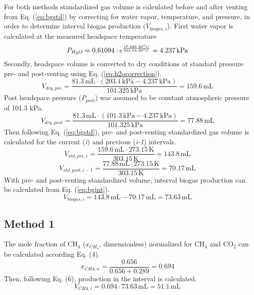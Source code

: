 \documentclass[]{article}
\newcommand{\unit}[1]{\ensuremath{\, \mathrm{#1}}}
\begin{document}
For both methods standardized gas volume is calculated before and after venting from Eq. (\ref{eq:bgstd}) by correcting for water vapor, temperature, and pressure, in order to determine interval biogas production ($V_{biogas,i}$). 
First water vapor is calculated at the measured headspace temperature
\begin{equation*}
    P_{H_{2}O} = 0.61094 \cdot e^\frac{17.625 \cdot 30\degree C}{243.04 \cdot 30\degree C} = 4.237\unit{kPa}
\end{equation*}
Secondly, headspace volume is converted to dry conditions at standard pressure pre- and post-venting using Eq. (\ref{eq:h2ocorrection}). 
\begin{equation*}
  V_{dry,pre} = \frac{81.3\unit{mL} \cdot (203.1\unit{kPa} - 4.237\unit{kPa})}{101.325\unit{kPa}} = 159.6\unit{mL}
\end{equation*}
Post headspace pressure ($P_{post}$) was assumed to be constant atmospheric pressure of 101.3 kPa. 
\begin{equation*}
    V_{dry,post} = \frac{81.3\unit{mL} \cdot (101.3\unit{kPa} - 4.237\unit{kPa})}{101.325\unit{kPa}} = 77.88\unit{mL}
\end{equation*}
Then following Eq. (\ref{eq:bgstd}), pre- and post-venting standardized gas volume is calculated for the current (\textit{i}) and previous (\textit{i-1}) intervals. 
\begin{equation*}
    V_{std,pre,i} = \frac{159.6\unit{mL} \cdot 273.15\unit{K}}{303.15\unit{K}} = 143.8\unit{mL}
\end{equation*}
\begin{equation*}
    V_{std,post,i-1} = \frac{77.88\unit{mL} \cdot 273.15\unit{K}}{303.15\unit{K}} = 70.17\unit{mL}
\end{equation*}
With pre- and post-venting standardized volume, interval biogas production can be calculated from Eq. (\ref{eq:bgint}).
\begin{equation*}
    V_{biogas,i} = 143.8\unit{mL} - 70.17\unit{mL} = 73.63\unit{mL}
\end{equation*}
\subsection{Method 1}
The mole fraction of CH$_{4}$ ($x_{CH_4}$, dimensionless) normalized for CH$_{4}$ and CO$_{2}$ can be calculated according Eq. (4). 
\begin{equation*}
    x_{CH{4},n} = \frac{0.656}{0.656 + 0.289} = 0.694
\end{equation*}
Then, following Eq. (6),  production in the interval is calculated.
\begin{equation*}
    V_{CH{4},i} = 0.694 \cdot 73.63\unit{mL} = 51.1\unit{mL}
\end{equation*}
\end{document}
